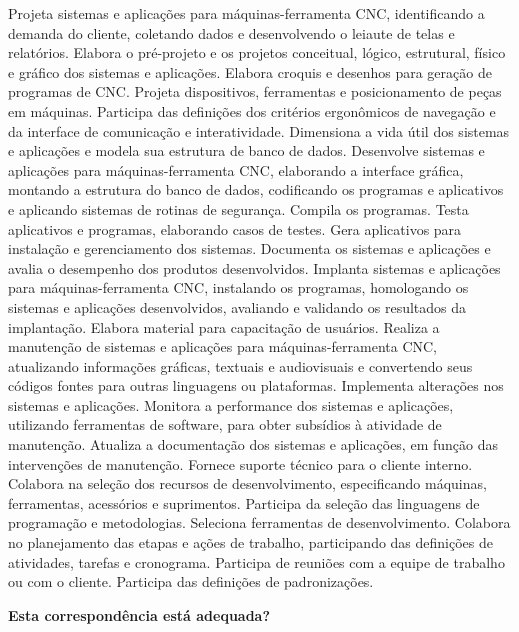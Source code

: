\documentclass[
]{article}
\begin{document}
Projeta sistemas e aplicações para máquinas-ferramenta CNC,
identificando a demanda do cliente, coletando dados e desenvolvendo o
leiaute de telas e relatórios. Elabora o pré-projeto e os projetos
conceitual, lógico, estrutural, físico e gráfico dos sistemas e
aplicações. Elabora croquis e desenhos para geração de programas de CNC.
Projeta dispositivos, ferramentas e posicionamento de peças em máquinas.
Participa das definições dos critérios ergonômicos de navegação e da
interface de comunicação e interatividade. Dimensiona a vida útil dos
sistemas e aplicações e modela sua estrutura de banco de dados.
Desenvolve sistemas e aplicações para máquinas-ferramenta CNC,
elaborando a interface gráfica, montando a estrutura do banco de dados,
codificando os programas e aplicativos e aplicando sistemas de rotinas
de segurança. Compila os programas. Testa aplicativos e programas,
elaborando casos de testes. Gera aplicativos para instalação e
gerenciamento dos sistemas. Documenta os sistemas e aplicações e avalia
o desempenho dos produtos desenvolvidos. Implanta sistemas e aplicações
para máquinas-ferramenta CNC, instalando os programas, homologando os
sistemas e aplicações desenvolvidos, avaliando e validando os resultados
da implantação. Elabora material para capacitação de usuários. Realiza a
manutenção de sistemas e aplicações para máquinas-ferramenta CNC,
atualizando informações gráficas, textuais e audiovisuais e convertendo
seus códigos fontes para outras linguagens ou plataformas. Implementa
alterações nos sistemas e aplicações. Monitora a performance dos
sistemas e aplicações, utilizando ferramentas de software, para obter
subsídios à atividade de manutenção. Atualiza a documentação dos
sistemas e aplicações, em função das intervenções de manutenção. Fornece
suporte técnico para o cliente interno. Colabora na seleção dos recursos
de desenvolvimento, especificando máquinas, ferramentas, acessórios e
suprimentos. Participa da seleção das linguagens de programação e
metodologias. Seleciona ferramentas de desenvolvimento. Colabora no
planejamento das etapas e ações de trabalho, participando das definições
de atividades, tarefas e cronograma. Participa de reuniões com a equipe
de trabalho ou com o cliente. Participa das definições de padronizações.

\begin{Form}
\textbf{Esta correspondência está adequada?} \\ 
\end{Form}
\end{document}
